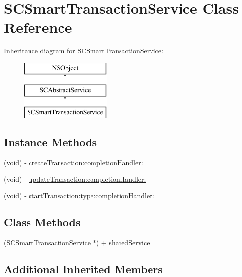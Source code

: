 \hypertarget{interface_s_c_smart_transaction_service}{}\section{S\+C\+Smart\+Transaction\+Service Class Reference}
\label{interface_s_c_smart_transaction_service}
Inheritance diagram for S\+C\+Smart\+Transaction\+Service\+:\begin{figure}[H]
\begin{center}
\leavevmode
\includegraphics[height=3.000000cm]{interface_s_c_smart_transaction_service}
\end{center}
\end{figure}
\subsection*{Instance Methods}
\begin{DoxyCompactItemize}
\item 
(void) -\/ \hyperlink{interface_s_c_smart_transaction_service_a378d64e621c7771e221c7ad3efce1726}{create\+Transaction\+:completion\+Handler\+:}
\item 
(void) -\/ \hyperlink{interface_s_c_smart_transaction_service_a1cbb2b1a5d3329564ef7b12d95d95745}{update\+Transaction\+:completion\+Handler\+:}
\item 
(void) -\/ \hyperlink{interface_s_c_smart_transaction_service_acacd802bf2c49263c4c088c85885433a}{start\+Transaction\+:type\+:completion\+Handler\+:}
\end{DoxyCompactItemize}
\subsection*{Class Methods}
\begin{DoxyCompactItemize}
\item 
(\hyperlink{interface_s_c_smart_transaction_service}{S\+C\+Smart\+Transaction\+Service} $\ast$) + \hyperlink{interface_s_c_smart_transaction_service_a61ef1e67357d94f79c7df6490dc0ab67}{shared\+Service}
\end{DoxyCompactItemize}
\subsection*{Additional Inherited Members}


